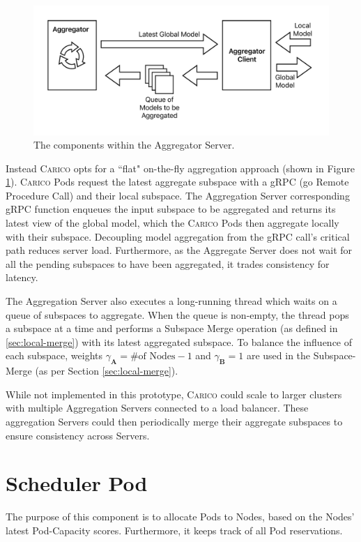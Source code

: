 \begin{figure}[ht!]
    \centering
    \includegraphics[width=\textwidth]{images/spazio-agg.pdf}
    \caption{The components within the Aggregator Server.}
    \label{fig:spazio-agg-components}
\end{figure}

Instead \textsc{Carico} opts for a ``flat" on-the-fly aggregation approach
(shown in Figure \ref{fig:spazio-agg-components}).
\textsc{Carico} Pods request the latest aggregate subspace with a gRPC (go
Remote Procedure Call) and their local subspace. The Aggregation Server
corresponding gRPC function enqueues the input subspace to be aggregated and
returns its latest view of the global model, which the \textsc{Carico} Pods then
aggregate locally with their subspace. Decoupling model aggregation from the
gRPC call's critical path reduces server load. Furthermore, as the Aggregate
Server does not wait for all the pending subspaces to have been aggregated, it
trades consistency for latency.

The Aggregation Server also executes a long-running thread which waits on a
queue of subspaces to aggregate. When the queue is non-empty, the thread pops
a subspace at a time and performs a Subspace Merge operation (as defined in
\ref{sec:local-merge}) with its latest aggregated subspace. To balance the
influence of each subspace, weights $\gamma_{\mathbf{A}} = \text{\# of Nodes}
- 1$ and $\gamma_{\mathbf{B}} = 1$ are used in the Subspace-Merge (as per
Section \ref{sec:local-merge}).

While not implemented in this prototype, \textsc{Carico} could scale to larger
clusters with  multiple Aggregation Servers connected to a load balancer. These
aggregation Servers could then periodically merge their aggregate subspaces to
ensure consistency across Servers.

\section{Scheduler Pod}
The purpose of this component is to allocate Pods to Nodes, based on the Nodes'
latest Pod-Capacity scores. Furthermore, it keeps track of all Pod reservations.

